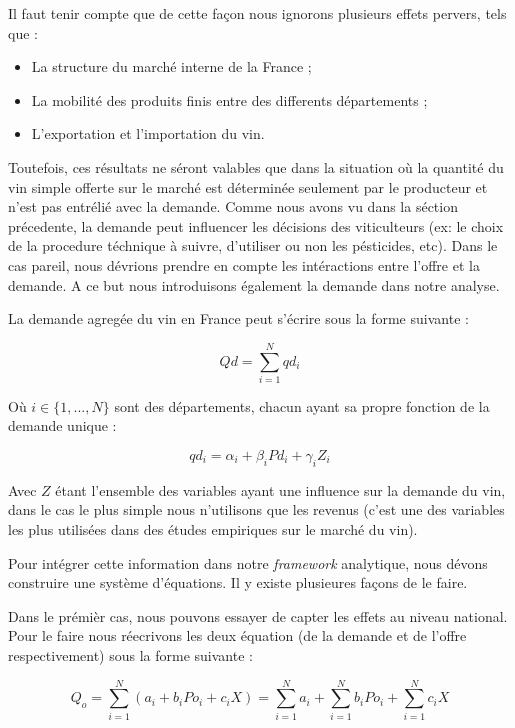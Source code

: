 \documentclass[11pt,]{article}
\providecommand{\tightlist}{%
  \setlength{\itemsep}{0pt}\setlength{\parskip}{0pt}}
\begin{document}
Il faut tenir compte que de cette façon nous ignorons plusieurs effets
pervers, tels que :

\begin{itemize}
\tightlist
\item
  La structure du marché interne de la France ;
\item
  La mobilité des produits finis entre des differents départements ;
\item
  L'exportation et l'importation du vin.
\end{itemize}

Toutefois, ces résultats ne séront valables que dans la situation où la
quantité du vin simple offerte sur le marché est déterminée seulement
par le producteur et n'est pas entrélié avec la demande. Comme nous
avons vu dans la séction précedente, la demande peut influencer les
décisions des viticulteurs (ex: le choix de la procedure téchnique à
suivre, d'utiliser ou non les pésticides, etc). Dans le cas pareil, nous
dévrions prendre en compte les intéractions entre l'offre et la demande.
A ce but nous introduisons également la demande dans notre analyse.

La demande agregée du vin en France peut s'écrire sous la forme suivante
:

\begin{equation*}
    Qd = \sum_{i = 1}^{N} qd_i 
\end{equation*}

Où \(i \in \{1, ..., N\}\) sont des départements, chacun ayant sa propre
fonction de la demande unique :

\begin{equation*}
    qd_i = \alpha_i + \beta_i Pd_i + \gamma_i Z_i 
\end{equation*}

Avec \(Z\) étant l'ensemble des variables ayant une influence sur la
demande du vin, dans le cas le plus simple nous n'utilisons que les
revenus (c'est une des variables les plus utilisées dans des études
empiriques sur le marché du vin).

Pour intégrer cette information dans notre \emph{framework} analytique,
nous dévons construire une système d'équations. Il y existe plusieures
façons de le faire.

Dans le prémièr cas, nous pouvons essayer de capter les effets au niveau
national. Pour le faire nous réecrivons les deux équation (de la demande
et de l'offre respectivement) sous la forme suivante :

\begin{equation*}
    Q_o = \sum_{i = 1}^{N} (a_i + b_i Po_i + c_i X) = \sum_{i = 1}^{N} a_i + \sum_{i = 1}^{N} b_i Po_i + \sum_{i = 1}^{N} c_i X
\end{equation*}
\end{document}
